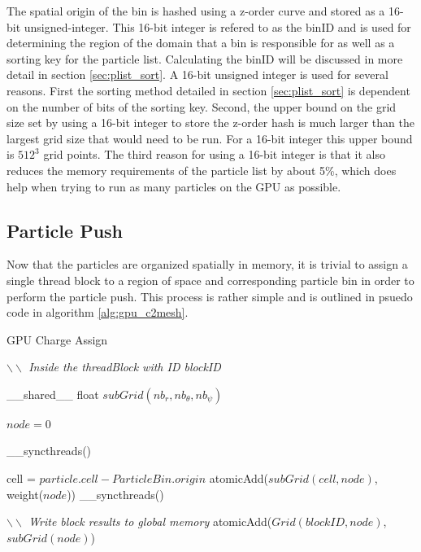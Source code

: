 The spatial origin of the bin is hashed using a z-order curve and stored as a 16-bit unsigned-integer. This 16-bit integer is refered to as the binID and is used for determining the region of the domain that a bin is responsible for as well as a sorting key for the particle list. Calculating the binID will be discussed in more detail in section \ref{sec:plist_sort}. A 16-bit unsigned integer is used for several reasons. First the sorting method detailed in section \ref{sec:plist_sort} is dependent on the number of bits of the sorting key. Second, the upper bound on the grid size set by using a 16-bit integer to store the z-order hash is much larger than the largest grid size that would need to be run. For a 16-bit integer this upper bound is $512^3$ grid points. The third reason for using a 16-bit integer is that it also reduces the memory requirements of the particle list by about 5\%, which does help when trying to run as many particles on the GPU as possible. 

	\subsection{Particle Push}
Now that the particles are organized spatially in memory, it is trivial to assign a single thread block to a region of space and corresponding particle bin in order to perform the particle push. This process is rather simple and is outlined in psuedo code in algorithm \ref{alg:gpu_c2mesh}. 

\begin{algorithm}
	\caption{GPU Charge Assign}
	\label{alg:gpu_c2mesh}
	\begin{algorithmic}
			\STATE \emph{$\backslash \backslash$ Inside the threadBlock with ID blockID}

			\STATE \_\_shared\_\_ float $subGrid(nb_r,nb_{\theta},nb_{\psi})$

			\STATE $node = 0$
			\ENDFOR
			
			\STATE \_\_syncthreads()
			

				\STATE cell = $particle.cell - ParticleBin.origin$
					\STATE atomicAdd($subGrid(cell,node)$, weight($node$))
				\ENDFOR
			\ENDFOR
			\STATE \_\_syncthreads()

			\STATE \emph{$\backslash \backslash$ Write block results to global memory}
				\STATE atomicAdd($Grid(blockID,node)$, $subGrid(node)$)
			\ENDFOR
			
		\ENDFOR
	\end{algorithmic}
\end{algorithm}

